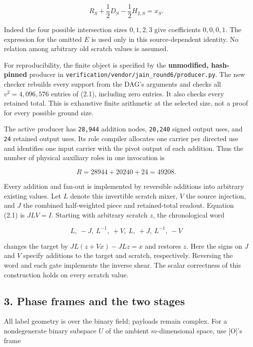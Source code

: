 \documentclass[
  11pt,
]{article}
\begin{document}
\[
 R_S+\frac12D_S-\frac12H_{2,S}=x_S.
 \tag{2.1}
\]

Indeed the four possible intersection sizes \(0,1,2,3\) give
coefficients \(0,0,0,1\). The expression for the omitted \(E\) is used
only in this source-dependent identity. No relation among arbitrary old
scratch values is assumed.

For reproducibility, the finite object is specified by the
\textbf{unmodified, hash-pinned} producer in
\texttt{verification/vendor/jain\_round6/producer.py}. The new checker
rebuilds every support from the DAG's arguments and checks all
\(v^2=4{,}096{,}576\) entries of (2.1), including zero entries. It also
checks every retained total. This is exhaustive finite arithmetic at the
selected size, not a proof for every possible ground size.

The active producer has \texttt{28,944} addition nodes, \texttt{20,240}
signed output uses, and \texttt{24} retained output uses. Its role
compiler allocates one carrier per directed use and identifies one input
carrier with the pivot output of each addition. Thus the number of
physical auxiliary roles in one invocation is

\[
 R=28944+20240+24=49208.
 \tag{2.2}
\]

Every addition and fan-out is implemented by reversible additions into
arbitrary existing values. Let \(L\) denote this invertible scratch
mixer, \(V\) the source injection, and \(J\) the combined half-weighted
piece and retained-total readout. Equation (2.1) is \(JLV=I\). Starting
with arbitrary scratch \(z\), the chronological word

\[
 L,\ -J,\ L^{-1},\ +V,\ L,\ +J,\ L^{-1},\ -V
 \tag{2.3}
\]

changes the target by \(JL(z+Vx)-JLz=x\) and restores \(z\). Here the
signs on \(J\) and \(V\) specify additions to the target and scratch,
respectively. Reversing the word and each gate implements the inverse
shear. The scalar correctness of this construction holds on every
scratch value.

\subsection{3. Phase frames and the two
stages}\label{phase-frames-and-the-two-stages}

All label geometry is over the binary field; payloads remain complex.
For a nondegenerate binary subspace \(U\) of the ambient
\(m\)-dimensional space, use {[}O{]}'s frame
\end{document}

